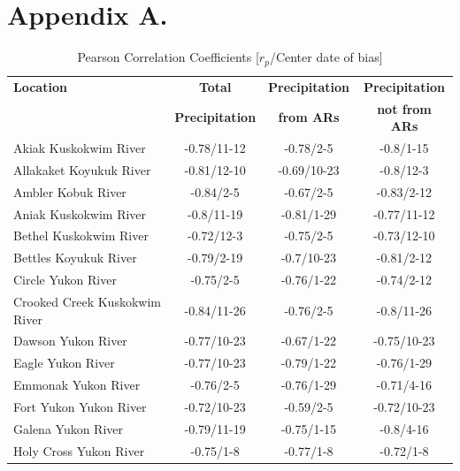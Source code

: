 \documentclass[12pts,draft]{AR_analysis_}
\begin{document}
\appendix
\section*{Appendix A.}

\begin{table}[h]  %
    \centering  %
    \caption{Pearson Correlation Coefficients [$r_{p}$/Center date of bias]}  %
    \label{tab:pearson}  %
    
    \begin{tabular}{lccc}
    \toprule
    \textbf{Location} & \textbf{Total} & \textbf{Precipitation} & \textbf{Precipitation} \\
    \textbf{} & \textbf{Precipitation} & \textbf{from ARs} & \textbf{not from ARs} \\
    \midrule
	Akiak Kuskokwim River         &  -0.78/11-12 &    -0.78/2-5 &    -0.8/1-15 \\
	Allakaket Koyukuk River       &  -0.81/12-10 &  -0.69/10-23 &    -0.8/12-3 \\
	Ambler Kobuk River            &    -0.84/2-5 &    -0.67/2-5 &   -0.83/2-12 \\
	Aniak Kuskokwim River         &   -0.8/11-19 &   -0.81/1-29 &  -0.77/11-12 \\
	Bethel Kuskokwim River        &   -0.72/12-3 &    -0.75/2-5 &  -0.73/12-10 \\
	Bettles Koyukuk River         &   -0.79/2-19 &   -0.7/10-23 &   -0.81/2-12 \\
	Circle Yukon River            &    -0.75/2-5 &   -0.76/1-22 &   -0.74/2-12 \\
	Crooked Creek Kuskokwim River &  -0.84/11-26 &    -0.76/2-5 &   -0.8/11-26 \\
	Dawson Yukon River            &  -0.77/10-23 &   -0.67/1-22 &  -0.75/10-23 \\
	Eagle Yukon River             &  -0.77/10-23 &   -0.79/1-22 &   -0.76/1-29 \\
	Emmonak Yukon River           &    -0.76/2-5 &   -0.76/1-29 &   -0.71/4-16 \\
	Fort Yukon Yukon River        &  -0.72/10-23 &    -0.59/2-5 &  -0.72/10-23 \\
	Galena Yukon River            &  -0.79/11-19 &   -0.75/1-15 &    -0.8/4-16 \\
	Holy Cross Yukon River        &    -0.75/1-8 &    -0.77/1-8 &    -0.72/1-8 \\

\end{tabular}
\end{table}
\end{document}
